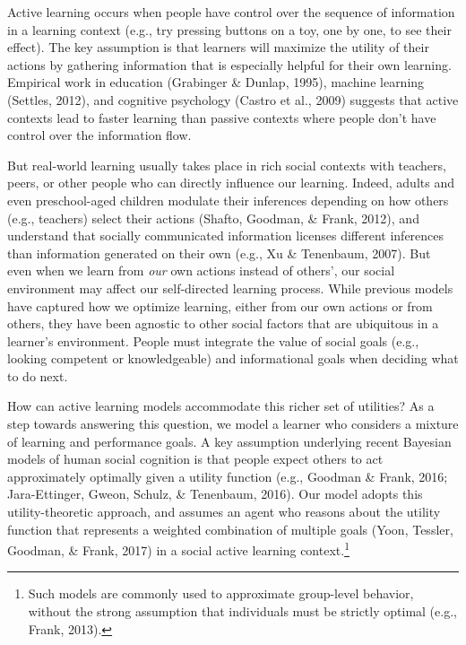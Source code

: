 \documentclass[10pt, letterpaper]{article}
\begin{document}
Active learning occurs when people have control over the sequence of
information in a learning context (e.g., try pressing buttons on a toy,
one by one, to see their effect). The key assumption is that learners
will maximize the utility of their actions by gathering information that
is especially helpful for their own learning. Empirical work in
education (Grabinger \& Dunlap, 1995), machine learning (Settles, 2012),
and cognitive psychology (Castro et al., 2009) suggests that active
contexts lead to faster learning than passive contexts where people
don't have control over the information flow.

But real-world learning usually takes place in rich social contexts with
teachers, peers, or other people who can directly influence our
learning. Indeed, adults and even preschool-aged children modulate their
inferences depending on how others (e.g., teachers) select their actions
(Shafto, Goodman, \& Frank, 2012), and understand that socially
communicated information licenses different inferences than information
generated on their own (e.g., Xu \& Tenenbaum, 2007). But even when we
learn from \emph{our} own actions instead of others', our social
environment may affect our self-directed learning process. While
previous models have captured how we optimize learning, either from our
own actions or from others, they have been agnostic to other social
factors that are ubiquitous in a learner's environment. People must
integrate the value of social goals (e.g., looking competent or
knowledgeable) and informational goals when deciding what to do next.

How can active learning models accommodate this richer set of utilities?
As a step towards answering this question, we model a learner who
considers a mixture of learning and performance goals. A key assumption
underlying recent Bayesian models of human social cognition is that
people expect others to act approximately optimally given a utility
function (e.g., Goodman \& Frank, 2016; Jara-Ettinger, Gweon, Schulz, \&
Tenenbaum, 2016). Our model adopts this utility-theoretic approach, and
assumes an agent who reasons about the utility function that represents
a weighted combination of multiple goals (Yoon, Tessler, Goodman, \&
Frank, 2017) in a social active learning context.\footnote{Such models
  are commonly used to approximate group-level behavior, without the
  strong assumption that individuals must be strictly optimal (e.g.,
  Frank, 2013).}
\end{document}
